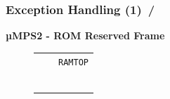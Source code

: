 \documentclass{beamer}
\begin{document}
\begin{frame}
	\frametitle{Exception Handling (1) \hspace{0pt plus 1 filll} \insertframenumber\,/\,\inserttotalframenumber}
	\begin{center}
		\begin{minipage}{0.48\textwidth}
			\begin{block}{\textbf{{\small µMPS2 - ROM Reserved Frame}}}
				\begin{figure}[h]
					\centering
					\renewcommand{\arraystretch}{0.736}
					\begin{tabular}{rcl}
						                                                                         &                                                                                              & \multirow{2}{*}{\texttt{{\tiny RAMTOP}}}      \\ \hhline{--~}
						\multicolumn{1}{l|}{\multirow{12}{*}{\rotatebox{90}{{\small\!\!\!RAM}}}} & \multicolumn{1}{c|}{\cellcolor{nord13}}                                                      &                                               \\
						\multicolumn{1}{l|}{}                                                    & \multicolumn{1}{c|}{\cellcolor{nord13}}                                                      &                                               \\
						\multicolumn{1}{l|}{}                                                    & \multicolumn{1}{c|}{\cellcolor{nord13}}                                                      &                                               \\
						\multicolumn{1}{l|}{}                                                    & \multicolumn{1}{c|}{\cellcolor{nord13}}                                                      &                                               \\
						\multicolumn{1}{l|}{}                                                    & \multicolumn{1}{c|}{\cellcolor{nord13}}                                                      &                                               \\
						\multicolumn{1}{l|}{}                                                    & \multicolumn{1}{c|}{\cellcolor{nord13}}                                                      &                                               \\
						\multicolumn{1}{l|}{}                                                    & \multicolumn{1}{c|}{\cellcolor{nord13}}                                                      &                                               \\

\end{tabular}
\end{figure}
\end{block}
\end{minipage}
\end{center}
\end{frame}
\end{document}
